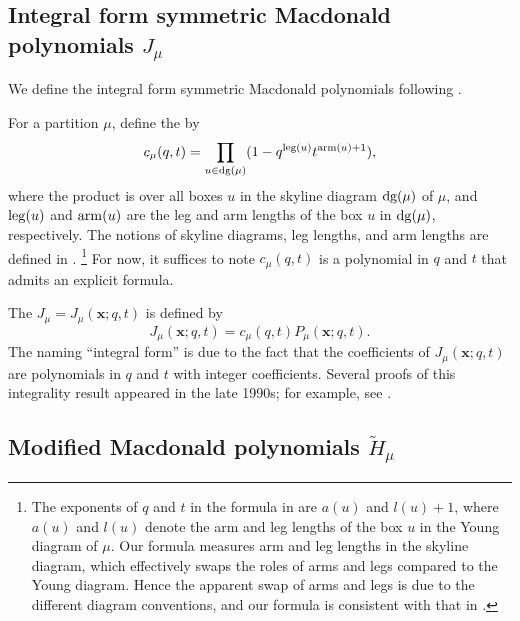 \subsection{Integral form symmetric Macdonald polynomials \texorpdfstring{\(J_\mu\)}{Jμ}}

We define the integral form symmetric Macdonald polynomials following \cite[Chapter VII, Section 8]{Mac04}.

For a partition \(\mu\), define the  by
\begin{equation} \label{eq:normalization-factor-c-mu}
	c_\mu(q, t) = \prod_{u \in \dg(\mu)} (1 - q^{\leg(u)} t^{\arm(u)+1}),
\end{equation}
where the product is over all boxes \(u\) in the skyline diagram \(\dg(\mu)\) of \(\mu\), and \(\operatorname{leg}(u)\) and \(\operatorname{arm}(u)\) are the leg and arm lengths of the box \(u\) in \(\dg(\mu)\), respectively.
The notions of skyline diagrams, leg lengths, and arm lengths are defined in .%
\footnote{
	The exponents of \(q\) and \(t\) in the formula in \cite[Chapter VII, Section 8]{Mac04} are \(a(u)\) and \(l(u)+1\), where \(a(u)\) and \(l(u)\) denote the arm and leg lengths of the box \(u\) in the Young diagram of \(\mu\).
	Our formula measures arm and leg lengths in the skyline diagram, which effectively swaps the roles of arms and legs compared to the Young diagram.
	Hence the apparent swap of arms and legs is due to the different diagram conventions, and our formula is consistent with that in \cite{Mac04}.
}
For now, it suffices to note \(c_\mu(q,t)\) is a polynomial in \(q\) and \(t\) that admits an explicit formula.

The  \(J_\mu = J_\mu(\mathbf{x}; q, t)\) is defined by
\begin{equation} \label{eq:J-algebraic-definition}
	J_\mu(\mathbf{x}; q, t) = c_\mu(q, t) P_\mu(\mathbf{x}; q, t).
\end{equation}
The naming ``integral form'' is due to the fact that
the coefficients of \(J_\mu(\mathbf{x}; q, t)\)
are polynomials in \(q\) and \(t\) with integer coefficients.
Several proofs of this integrality result appeared in the late 1990s; for example, see \cite{Kno97}.

\subsection{Modified Macdonald polynomials \texorpdfstring{\(\tilde{H}_\mu\)}{H̃μ}}

